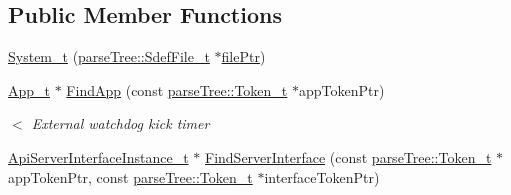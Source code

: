 \subsection*{Public Member Functions}
\begin{DoxyCompactItemize}
\item 
\hyperlink{struct_system__t_aba8a5aa246ae0ad7b1c8e02d493e8136}{System\+\_\+t} (\hyperlink{structparse_tree_1_1_sdef_file__t}{parse\+Tree\+::\+Sdef\+File\+\_\+t} $\ast$\hyperlink{update_daemon_8c_acf1f3d914b42896a64e8683abe22ae7a}{file\+Ptr})
\item 
\hyperlink{struct_app__t}{App\+\_\+t} $\ast$ \hyperlink{struct_system__t_abe39c841bb07fe6f9aab5af8817e32a9}{Find\+App} (const \hyperlink{structparse_tree_1_1_token__t}{parse\+Tree\+::\+Token\+\_\+t} $\ast$app\+Token\+Ptr)
\begin{DoxyCompactList}\small\item\em $<$ External watchdog kick timer \end{DoxyCompactList}\item 
\hyperlink{struct_api_server_interface_instance__t}{Api\+Server\+Interface\+Instance\+\_\+t} $\ast$ \hyperlink{struct_system__t_a3aff9d23cbe35457eefe2ab2f2ab39a8}{Find\+Server\+Interface} (const \hyperlink{structparse_tree_1_1_token__t}{parse\+Tree\+::\+Token\+\_\+t} $\ast$app\+Token\+Ptr, const \hyperlink{structparse_tree_1_1_token__t}{parse\+Tree\+::\+Token\+\_\+t} $\ast$interface\+Token\+Ptr)
\end{DoxyCompactItemize}
